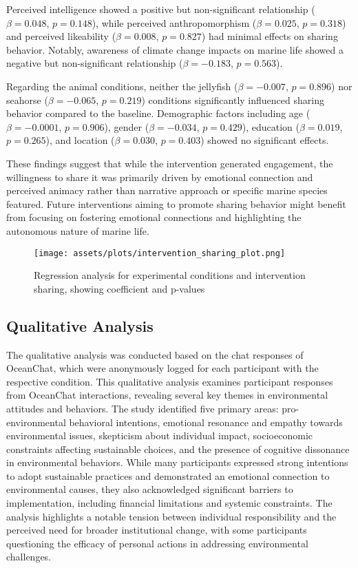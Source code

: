 \documentclass[sigconf, nonacm]{acmart}
\begin{document}
Perceived intelligence showed a positive but non-significant relationship ($\beta = 0.048$, $p = 0.148$), while perceived anthropomorphism ($\beta = 0.025$, $p = 0.318$) and perceived likeability ($\beta = 0.008$, $p = 0.827$) had minimal effects on sharing behavior. Notably, awareness of climate change impacts on marine life showed a negative but non-significant relationship ($\beta = -0.183$, $p = 0.563$).

Regarding the animal conditions, neither the jellyfish ($\beta = -0.007$, $p = 0.896$) nor seahorse ($\beta = -0.065$, $p = 0.219$) conditions significantly influenced sharing behavior compared to the baseline. Demographic factors including age ($\beta = -0.0001$, $p = 0.906$), gender ($\beta = -0.034$, $p = 0.429$), education ($\beta = 0.019$, $p = 0.265$), and location ($\beta = 0.030$, $p = 0.403$) showed no significant effects.

These findings suggest that while the intervention generated engagement, the willingness to share it was primarily driven by emotional connection and perceived animacy rather than narrative approach or specific marine species featured. Future interventions aiming to promote sharing behavior might benefit from focusing on fostering emotional connections and highlighting the autonomous nature of marine life.

\begin{figure}
    \centering
    \texttt{[image: assets/plots/intervention\_sharing\_plot.png]}
    \caption{Regression analysis for experimental conditions and intervention sharing, showing coefficient and p-values}
    \label{fig:intervention_sharing_post}
\end{figure}


\subsection{Qualitative Analysis}
The qualitative analysis was conducted based on the chat responses of OceanChat, which were anonymously logged for each participant with the respective condition. This qualitative analysis examines participant responses from OceanChat interactions, revealing several key themes in environmental attitudes and behaviors. The study identified five primary areas: pro-environmental behavioral intentions, emotional resonance and empathy towards environmental issues, skepticism about individual impact, socioeconomic constraints affecting sustainable choices, and the presence of cognitive dissonance in environmental behaviors. While many participants expressed strong intentions to adopt sustainable practices and demonstrated an emotional connection to environmental causes, they also acknowledged significant barriers to implementation, including financial limitations and systemic constraints. The analysis highlights a notable tension between individual responsibility and the perceived need for broader institutional change, with some participants questioning the efficacy of personal actions in addressing environmental challenges.
\end{document}
